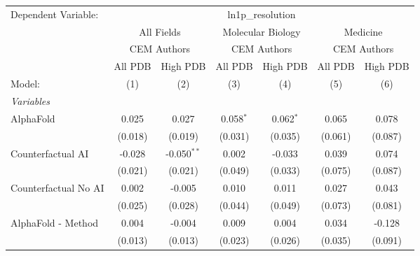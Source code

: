 \begingroup
\centering
\begin{tabular}{lcccccc}
   \tabularnewline \midrule \midrule
   Dependent Variable: & \multicolumn{6}{c}{ln1p\_resolution}\\
 & \multicolumn{2}{c}{All Fields} & \multicolumn{2}{c}{Molecular Biology} & \multicolumn{2}{c}{Medicine} \\
\cmidrule(lr){2-3} \cmidrule(lr){4-5} \cmidrule(lr){6-7}
 & \multicolumn{2}{c}{CEM Authors} & \multicolumn{2}{c}{CEM Authors} & \multicolumn{2}{c}{CEM Authors} \\
\cmidrule(lr){2-3} \cmidrule(lr){4-5} \cmidrule(lr){6-7}
 & \multicolumn{1}{c}{All PDB} & \multicolumn{1}{c}{High PDB} & \multicolumn{1}{c}{All PDB} & \multicolumn{1}{c}{High PDB} & \multicolumn{1}{c}{All PDB} & \multicolumn{1}{c}{High PDB} \\
\cmidrule(lr){2-2} \cmidrule(lr){3-3} \cmidrule(lr){4-4} \cmidrule(lr){5-5} \cmidrule(lr){6-6} \cmidrule(lr){7-7}
   Model:                                                     & (1)     & (2)           & (3)           & (4)           & (5)          & (6)\\  
   \midrule
   \emph{Variables}\\
   AlphaFold                                                  & 0.025   & 0.027         & 0.058$^{*}$   & 0.062$^{*}$   & 0.065        & 0.078\\   
                                                              & (0.018) & (0.019)       & (0.031)       & (0.035)       & (0.061)      & (0.087)\\   
   Counterfactual AI                                          & -0.028  & -0.050$^{**}$ & 0.002         & -0.033        & 0.039        & 0.074\\   
                                                              & (0.021) & (0.021)       & (0.049)       & (0.033)       & (0.075)      & (0.087)\\   
   Counterfactual No AI                                       & 0.002   & -0.005        & 0.010         & 0.011         & 0.027        & 0.043\\   
                                                              & (0.025) & (0.028)       & (0.044)       & (0.049)       & (0.073)      & (0.081)\\   
   AlphaFold - Method                                         & 0.004   & -0.004        & 0.009         & 0.004         & 0.034        & -0.128\\   
                                                              & (0.013) & (0.013)       & (0.023)       & (0.026)       & (0.035)      & (0.091)\\   

\end{tabular}
